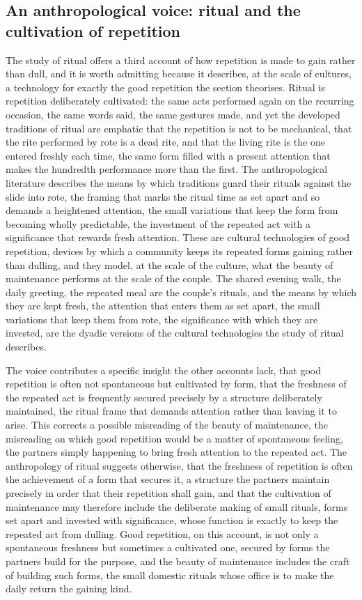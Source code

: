 \subsection{An anthropological voice: ritual and the cultivation of repetition}
\label{p22:sub:reproduction-ritual}

The study of ritual offers a third account of how repetition is made to gain rather than dull, and it is worth admitting because it describes, at the scale of cultures, a technology for exactly the good repetition the section theorises. Ritual is repetition deliberately cultivated: the same acts performed again on the recurring occasion, the same words said, the same gestures made, and yet the developed traditions of ritual are emphatic that the repetition is not to be mechanical, that the rite performed by rote is a dead rite, and that the living rite is the one entered freshly each time, the same form filled with a present attention that makes the hundredth performance more than the first. The anthropological literature describes the means by which traditions guard their rituals against the slide into rote, the framing that marks the ritual time as set apart and so demands a heightened attention, the small variations that keep the form from becoming wholly predictable, the investment of the repeated act with a significance that rewards fresh attention. These are cultural technologies of good repetition, devices by which a community keeps its repeated forms gaining rather than dulling, and they model, at the scale of the culture, what the beauty of maintenance performs at the scale of the couple. The shared evening walk, the daily greeting, the repeated meal are the couple's rituals, and the means by which they are kept fresh, the attention that enters them as set apart, the small variations that keep them from rote, the significance with which they are invested, are the dyadic versions of the cultural technologies the study of ritual describes.

The voice contributes a specific insight the other accounts lack, that good repetition is often not spontaneous but cultivated by form, that the freshness of the repeated act is frequently secured precisely by a structure deliberately maintained, the ritual frame that demands attention rather than leaving it to arise. This corrects a possible misreading of the beauty of maintenance, the misreading on which good repetition would be a matter of spontaneous feeling, the partners simply happening to bring fresh attention to the repeated act. The anthropology of ritual suggests otherwise, that the freshness of repetition is often the achievement of a form that secures it, a structure the partners maintain precisely in order that their repetition shall gain, and that the cultivation of maintenance may therefore include the deliberate making of small rituals, forms set apart and invested with significance, whose function is exactly to keep the repeated act from dulling. Good repetition, on this account, is not only a spontaneous freshness but sometimes a cultivated one, secured by forms the partners build for the purpose, and the beauty of maintenance includes the craft of building such forms, the small domestic rituals whose office is to make the daily return the gaining kind.

